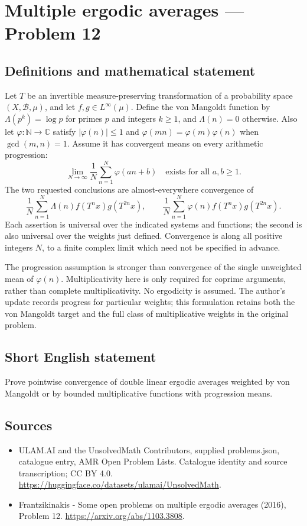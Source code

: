 \documentclass[11pt,a4paper]{article}
\begin{document}
\section*{Multiple ergodic averages — Problem 12}\label{statement}

\subsection{Definitions and mathematical statement}
Let $T$ be an invertible measure-preserving transformation
of a probability space $(X,\mathcal B,\mu)$, and let
$f,g\in L^\infty(\mu)$. Define the von Mangoldt function
by $\Lambda(p^k)=\log p$ for primes $p$ and integers
$k\ge1$, and $\Lambda(n)=0$ otherwise.
Also let $\varphi:\mathbb N\to\mathbb C$ satisfy
$|\varphi(n)|\le1$ and
$\varphi(mn)=\varphi(m)\varphi(n)$ when $\gcd(m,n)=1$.
Assume it has convergent means on every arithmetic
progression:
\[
      \lim_{N\to\infty}\frac1N\sum_{n=1}^N
                      \varphi(an+b)\quad\text{exists for all }a,b\ge1.
\]
The two requested conclusions are almost-everywhere
convergence of
\[
 \frac1N\sum_{n=1}^N\Lambda(n)f(T^n x)g(T^{2n}x),
 \qquad
 \frac1N\sum_{n=1}^N\varphi(n)f(T^n x)g(T^{2n}x).
\]
Each assertion is universal over the indicated systems
and functions; the second is also universal over the
weights just defined. Convergence is along all positive
integers $N$, to a finite complex limit which need not
be specified in advance.

The progression assumption is stronger than convergence
of the single unweighted mean of $\varphi(n)$.
Multiplicativity here is only required for coprime
arguments, rather than complete multiplicativity. No
ergodicity is assumed. The author's update records
progress for particular weights; this formulation
retains both the von Mangoldt target and the full
class of multiplicative weights in the original problem.
\subsection{Short English statement}
Prove pointwise convergence of double linear ergodic averages weighted by von Mangoldt or by bounded multiplicative functions with progression means.
\subsection{Sources}
\begin{itemize}
\item[S1] ULAM.AI and the UnsolvedMath Contributors, supplied problems.json, catalogue entry, AMR Open Problem Lists. Catalogue identity and source transcription; CC BY 4.0.
\url{https://huggingface.co/datasets/ulamai/UnsolvedMath}.
\item[S2] Frantzikinakis - Some open problems on multiple ergodic averages (2016), Problem 12. 
\url{https://arxiv.org/abs/1103.3808}.
\end{itemize}
\end{document}
